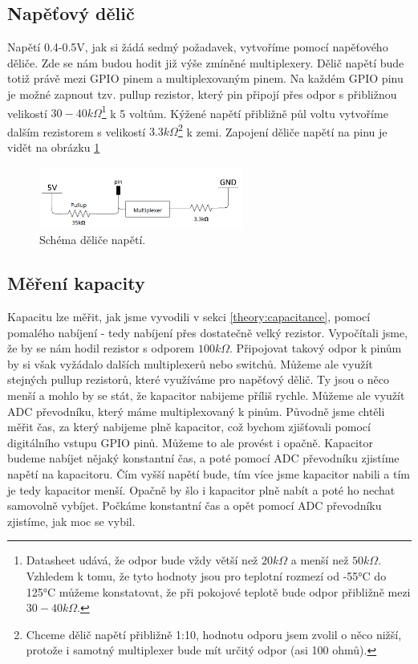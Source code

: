 \documentclass[11pt,a4paper,twoside,openright]{report}
\begin{document}
\subsection {Napěťový dělič \label{voltage_divider}}

Napětí 0.4-0.5V, jak si žádá sedmý požadavek, vytvoříme pomocí napěťového děliče. Zde se nám budou hodit již výše zmíněné multiplexery. Dělič napětí bude totiž právě mezi GPIO pinem a multiplexovaným pinem. Na každém GPIO pinu je možné zapnout tzv. pullup rezistor, který pin připojí přes odpor s přibližnou velikostí $30-40k\Omega$\footnote{Datasheet udává, že odpor bude vždy větší než $20k\Omega$ a menší než $50k\Omega$. Vzhledem k tomu, že tyto hodnoty jsou pro teplotní rozmezí od -55°C do 125°C můžeme konstatovat, že při pokojové teplotě bude odpor přibližně mezi $30-40k\Omega$.} k 5 voltům. Kýžené napětí přibližně půl voltu vytvoříme dalším rezistorem s velikostí $3.3k\Omega$\footnote{Chceme dělič napětí přibližně 1:10, hodnotu odporu jsem zvolil o něco nižší, protože i samotný multiplexer bude mít určitý odpor (asi 100 ohmů).} k zemi. Zapojení děliče napětí na pinu je vidět na obrázku \ref{fig:voltage_divider}


\begin{figure}[ht!]
  \includegraphics[width=0.6\textwidth]{img/voltage_divider.png}
  \centering
  \caption{Schéma děliče napětí.}
  \label{fig:voltage_divider}
\end{figure}

\subsection{Měření kapacity}

Kapacitu lze měřit, jak jsme vyvodili v sekci \ref{theory:capacitance}, pomocí pomalého nabíjení - tedy nabíjení přes dostatečně velký rezistor. Vypočítali jsme, že by se nám hodil rezistor s odporem $100k\Omega$. Připojovat takový odpor k pinům by si však vyžádalo dalších multiplexerů nebo switchů. Můžeme ale využít stejných pullup rezistorů, které využíváme pro napěťový dělič. Ty jsou o něco menší a mohlo by se stát, že kapacitor nabijeme příliš rychle. Můžeme ale využít ADC převodníku, který máme multiplexovaný k pinům. Původně jsme chtěli měřit čas, za který nabijeme plně kapacitor, což bychom zjišťovali pomocí digitálního vstupu GPIO pinů. Můžeme to ale provést i opačně. Kapacitor budeme nabíjet nějaký konstantní čas, a poté pomocí ADC převodníku zjistíme napětí na kapacitoru. Čím vyšší napětí bude, tím více jsme kapacitor nabili a tím je tedy kapacitor menší. Opačně by šlo i kapacitor plně nabít a poté ho nechat samovolně vybíjet. Počkáme konstantní čas a opět pomocí ADC převodníku zjistíme, jak moc se vybil. 
\end{document}
